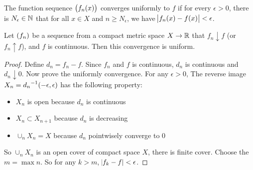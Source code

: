 \begin{definition}
    The function sequence $\sequence{f_n (x)}$ converges uniformly to $f$ if for every $\epsilon >0$, there is $N_\epsilon \in \mathbb{N}$ that for all $x \in X$ and $n \geq N_\epsilon$, we have $\abs{f_n (x) - f(x)} < \epsilon$.
\end{definition}

\begin{theorem}
    Let $\sequence{f_n}$ be a sequence from a compact metric space $X \rightarrow \mathbb{R}$ that $f_n \downarrow f$ (or $f_n \uparrow f$), and $f$ is continuous. Then this convergence is uniform.
\end{theorem}
\begin{proof}
    Define $d_n = f_n - f$. Since $f_n$ and $f$ is continuous, $d_n$ is continuous and $d_n \downarrow 0$. Now prove the uniformly convergence. For any $\epsilon > 0$, The reverse image $X_n = {d_n}^{-1}(-\epsilon, \epsilon)$ has the following property:
    \begin{itemize}
        \item $X_n$ is open because $d_n$ is continuous
        \item $X_n \subset X_{n+1}$ because $d_n$ is decreasing
        \item $\cup_n X_n = X$ because $d_n$ pointwisely converge to $0$
    \end{itemize}
    
    So $\cup_n X_n$ is an open cover of compact space $X$, there is finite cover. Choose the $m = \max n$. So for any $k > m$, $\abs{f_k - f} < \epsilon$.
\end{proof}


